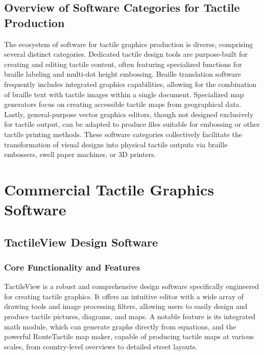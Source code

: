 \subsection{Overview of Software Categories for Tactile Production}

The ecosystem of software for tactile graphics production is diverse, comprising several distinct categories. Dedicated tactile design tools are purpose-built for creating and editing tactile content, often featuring specialized functions for braille labeling and multi-dot height embossing. Braille translation software frequently includes integrated graphics capabilities, allowing for the combination of braille text with tactile images within a single document. Specialized map generators focus on creating accessible tactile maps from geographical data. Lastly, general-purpose vector graphics editors, though not designed exclusively for tactile output, can be adapted to produce files suitable for embossing or other tactile printing methods. These software categories collectively facilitate the transformation of visual designs into physical tactile outputs via braille embossers, swell paper machines, or 3D printers.\cite{TouchMapper,DuxburyDetails,TactileViewIrie,NYUWorkflow,GetBraille,ProBlind,DuxburyProducts,BlindSVG}

\section{Commercial Tactile Graphics Software}

\subsection{TactileView Design Software}

\subsubsection{Core Functionality and Features}

TactileView is a robust and comprehensive design software specifically engineered for creating tactile graphics. It offers an intuitive editor with a wide array of drawing tools and image processing filters, allowing users to easily design and produce tactile pictures, diagrams, and maps.\cite{DuxburyDetails,BlindSVG} A notable feature is its integrated math module, which can generate graphs directly from equations, and the powerful RouteTactile map maker, capable of producing tactile maps at various scales, from country-level overviews to detailed street layouts.\cite{DuxburyDetails,BlindSVG,DuxburyNews}

